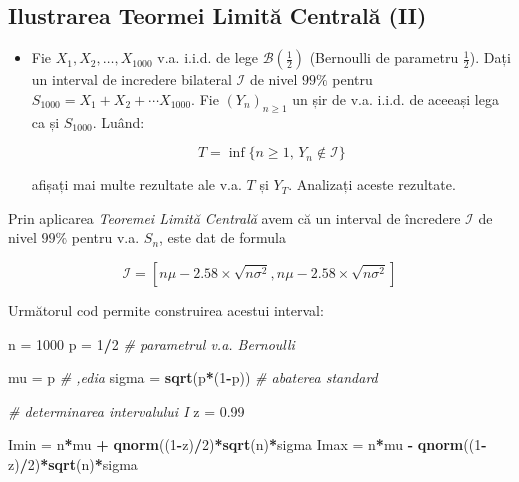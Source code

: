 \documentclass[]{article}
\newenvironment{Shaded}{\begin{snugshade}}{\end{snugshade}}
\newcommand{\CommentTok}[1]{\textcolor[rgb]{0.56,0.35,0.01}{\textit{#1}}}
\newcommand{\DecValTok}[1]{\textcolor[rgb]{0.00,0.00,0.81}{#1}}
\newcommand{\FloatTok}[1]{\textcolor[rgb]{0.00,0.00,0.81}{#1}}
\newcommand{\KeywordTok}[1]{\textcolor[rgb]{0.13,0.29,0.53}{\textbf{#1}}}
\newcommand{\NormalTok}[1]{#1}
\newcommand{\OperatorTok}[1]{\textcolor[rgb]{0.81,0.36,0.00}{\textbf{#1}}}
\newcommand{\StringTok}[1]{\textcolor[rgb]{0.31,0.60,0.02}{#1}}
\newenvironment{frshaded*}{%
  \def\FrameCommand{\fboxrule=\FrameRule\fboxsep=\FrameSep \fcolorbox{framecolor}{shadecolor1}}%
  \MakeFramed {\advance\hsize-\width \FrameRestore}}%
{\endMakeFramed}
\newenvironment{rmdblock}[1]
  {\begin{frshaded*}
  \begin{itemize}
  \renewcommand{\labelitemi}{
    \raisebox{-.7\height}[0pt][0pt]{
      {\setkeys{Gin}{width=2em,keepaspectratio}\texttt{[image: images/icons/\#1]}}
    }
  }
  \item
  }
  {
  \end{itemize}
  \end{frshaded*}
  }
\newenvironment{rmdexercise}
  {\begin{rmdblock}{exercise}}
  {\end{rmdblock}}
\begin{document}
\hypertarget{ilustrarea-teormei-limitux103-centralux103-ii}{%
\subsection{Ilustrarea Teormei Limită Centrală
(II)}\label{ilustrarea-teormei-limitux103-centralux103-ii}}

\begin{rmdexercise}
Fie \(X_1,X_2,\dots,X_{1000}\) v.a. i.i.d. de lege
\(\mathcal{B}(\frac{1}{2})\) (Bernoulli de parametru \(\frac{1}{2}\)).
Dați un interval de incredere bilateral \(\mathcal{I}\) de nivel
\(99\%\) pentru \(S_{1000}=X_1+X_2+\cdots X_{1000}\). Fie
\((Y_n)_{n\geq1}\) un șir de v.a. i.i.d. de aceeași lega ca și
\(S_{1000}\). Luând:

\[
  T=\inf\{n\geq1,\,Y_n\not\in\mathcal{I}\}
\]

afișați mai multe rezultate ale v.a. \(T\) și \(Y_T\). Analizați aceste
rezultate.
\end{rmdexercise}

Prin aplicarea \emph{Teoremei Limită Centrală} avem că un interval de
încredere \(\mathcal{I}\) de nivel \(99\%\) pentru v.a. \(S_n\), este
dat de formula

\[
  \mathcal{I} = \left[n\mu-2.58\times\sqrt{n\sigma^2}, n\mu-2.58\times\sqrt{n\sigma^2}\right]
\]

Următorul cod permite construirea acestui interval:

\begin{Shaded}
\begin{Highlighting}[]
\NormalTok{n =}\StringTok{ }\DecValTok{1000} 
\NormalTok{p =}\StringTok{ }\DecValTok{1}\OperatorTok{/}\DecValTok{2} \CommentTok{# parametrul v.a. Bernoulli}

\NormalTok{mu =}\StringTok{ }\NormalTok{p }\CommentTok{# ,edia }
\NormalTok{sigma =}\StringTok{ }\KeywordTok{sqrt}\NormalTok{(p}\OperatorTok{*}\NormalTok{(}\DecValTok{1}\OperatorTok{-}\NormalTok{p)) }\CommentTok{# abaterea standard}

\CommentTok{# determinarea intervalului I }
\NormalTok{z =}\StringTok{ }\FloatTok{0.99}

\NormalTok{Imin =}\StringTok{ }\NormalTok{n}\OperatorTok{*}\NormalTok{mu }\OperatorTok{+}\StringTok{ }\KeywordTok{qnorm}\NormalTok{((}\DecValTok{1}\OperatorTok{-}\NormalTok{z)}\OperatorTok{/}\DecValTok{2}\NormalTok{)}\OperatorTok{*}\KeywordTok{sqrt}\NormalTok{(n)}\OperatorTok{*}\NormalTok{sigma}
\NormalTok{Imax =}\StringTok{ }\NormalTok{n}\OperatorTok{*}\NormalTok{mu }\OperatorTok{-}\StringTok{ }\KeywordTok{qnorm}\NormalTok{((}\DecValTok{1}\OperatorTok{-}\NormalTok{z)}\OperatorTok{/}\DecValTok{2}\NormalTok{)}\OperatorTok{*}\KeywordTok{sqrt}\NormalTok{(n)}\OperatorTok{*}\NormalTok{sigma}
\end{Highlighting}
\end{Shaded}
\end{document}
